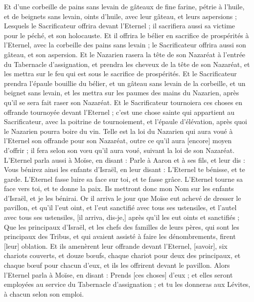 \begin{multicols}{2}
Et d'une corbeille de pains sans levain de gâteaux de fine farine, pétrie à l'huile, et de beignets sans levain, oints d'huile, avec leur gâteau, et leurs aspersions ;
Lesquels le Sacrificateur offrira devant l'Eternel ; il sacrifiera aussi sa victime pour le péché, et son holocauste.
Et il offrira le bélier en sacrifice de prospérités à l'Eternel, avec la corbeille des pains sans levain ; le Sacrificateur offrira aussi son gâteau, et son aspersion.
Et le Nazarien rasera la tête de son Nazaréat à l'entrée du Tabernacle d'assignation, et prendra les cheveux de la tête de son Nazaréat, et les mettra sur le feu qui est sous le sacrifice de prospérités.
Et le Sacrificateur prendra l'épaule bouillie du bélier, et un gâteau sans levain de la corbeille, et un beignet sans levain, et les mettra sur les paumes des mains du Nazarien, après qu'il se sera fait raser son Nazaréat.
Et le Sacrificateur tournoiera ces choses en offrande tournoyée devant l'Eternel ; c'est une chose sainte qui appartient au Sacrificateur, avec la poitrine de tournoiement, et l'épaule d'élévation, après quoi le Nazarien pourra boire du vin.
Telle est la loi du Nazarien qui aura voué à l'Eternel son offrande pour son Nazaréat, outre ce qu'il aura [encore] moyen d'offrir ; il fera selon son vœu qu'il aura voué, suivant la loi de son Nazaréat.
L'Eternel parla aussi à Moïse, en disant :
Parle à Aaron et à ses fils, et leur dis : Vous bénirez ainsi les enfants d'Israël, en leur disant :
L'Eternel te bénisse, et te garde.
L'Eternel fasse luire sa face sur toi, et te fasse grâce.
L'Eternel tourne sa face vers toi, et te donne la paix.
Ils mettront donc mon Nom sur les enfants d'Israël, et je les bénirai.
\VerseOne{}Or il arriva le jour que Moïse eut achevé de dresser le pavillon, et qu'il l'eut oint, et l'eut sanctifié avec tous ses ustensiles, et l'autel avec tous ses ustensiles, [il arriva, dis-je,] après qu'il les eut oints et sanctifiés ;
Que les principaux d'Israël, et les chefs des familles de leurs pères, qui sont les principaux des Tribus, et qui avaient assisté à faire les dénombrements, firent [leur] oblation.
Et ils amenèrent leur offrande devant l'Eternel, [savoir], six chariots couverts, et douze bœufs, chaque chariot pour deux des principaux, et chaque bœuf pour chacun d'eux, et ils les offrirent devant le pavillon.
Alors l'Eternel parla à Moïse, en disant :
Prends [ces choses] d'eux ; et elles seront employées au service du Tabernacle d'assignation ; et tu les donneras aux Lévites, à chacun selon son emploi.

\end{multicols}
